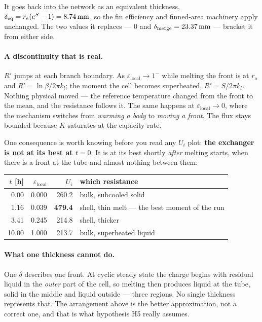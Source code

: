 \documentclass[11pt,a4paper]{article}
\newcommand{\epsloc}{\ensuremath{\varepsilon_{\mathrm{local}}}}
\begin{document}
It goes back into the network as an equivalent thickness,
$\delta_{\rm eq}=r_e(e^S-1)=\SI{8.74}{\milli\meter}$, so the fin efficiency and
finned-area machinery apply unchanged. The two values it replaces --- $0$ and
$\delta_{\rm merge}=\SI{23.37}{\milli\meter}$ --- bracket it from either side.

\paragraph{A discontinuity that is real.}
$R'$ jumps at each branch boundary. As $\epsloc\to1^-$ while melting the front
is at $r_o$ and $R'=\ln\beta/2\pi k_l$; the moment the cell becomes superheated,
$R'=S/2\pi k_l$. Nothing physical moved --- the reference temperature changed
from the front to the mean, and the resistance follows it. The same happens at
$\epsloc\to0$, where the mechanism switches from \emph{warming a body} to
\emph{moving a front}. The flux stays bounded because $K$ saturates at the
capacity rate.

One consequence is worth knowing before you read any $U_i$ plot: \textbf{the
exchanger is not at its best at $t=0$}. It is at its best shortly \emph{after}
melting starts, when there is a front at the tube and almost nothing between
them:

\begin{center}
\begin{tabular}{@{}r r r l@{}}
\toprule
$t$ [h] & $\epsloc$ & $U_i$ & which resistance \\
\midrule
 0.00 & 0.000 & 260.2 & bulk, subcooled solid \\
 1.16 & 0.039 & \textbf{479.4} & shell, thin melt --- the best moment of the run \\
 3.41 & 0.245 & 214.8 & shell, thicker \\
10.00 & 1.000 & 213.7 & bulk, superheated liquid \\
\bottomrule
\end{tabular}
\end{center}

\paragraph{What one thickness cannot do.}
One $\delta$ describes one front. At cyclic steady state the charge begins with
residual liquid in the \emph{outer} part of the cell, so melting then produces
liquid at the tube, solid in the middle and liquid outside --- three regions. No
single thickness represents that. The arrangement above is the better
approximation, not a correct one, and that is what hypothesis H5 really assumes.
\end{document}
